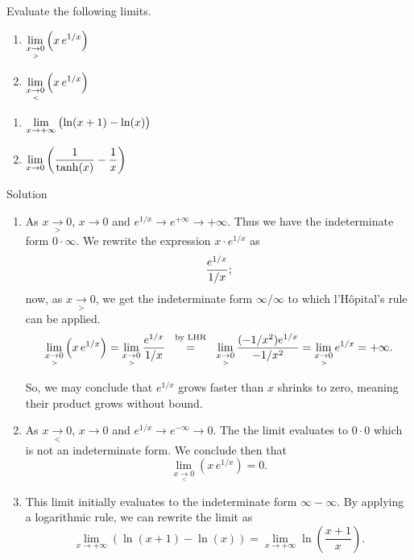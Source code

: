 \begin{example}\label{ex_LHR3}
Evaluate the following limits.

\noindent
\begin{minipage}[t]{.5\textwidth}
\begin{enumerate}
\item		$\displaystyle \lim_{x\underset{>}{\rightarrow}0} \left(x\, e^{1/x}\right)$
\item		$\displaystyle \lim_{x\underset{<}{\rightarrow}0} \left(x\, e^{1/x}\right)$
\end{enumerate}
\end{minipage}
\begin{minipage}[t]{.5\textwidth}
\begin{enumerate}\addtocounter{enumi}{2}
\item		$\displaystyle \lim_{x\to+\infty}\left( \ln(x+1)-\ln (x)\right)$
\ifanalysis\item $\displaystyle \lim_{x\to0}\left( \dfrac{1}{\tanh(x)}-\dfrac{1}{x}\right)$\fi
\end{enumerate}
\end{minipage}

Solution 

\begin{enumerate}
\item		As $x\underset{>}{\rightarrow}0$, $x\rightarrow 0$ and $e^{1/x}\rightarrow e^{+\infty}\rightarrow+\infty$. Thus we have the indeterminate form $0\cdot\infty$. We rewrite the expression $x\cdot e^{1/x}$ as $$\displaystyle\frac{e^{1/x}}{1/x};$$
now, as $x\underset{>}{\rightarrow}0$, we get the indeterminate form $\infty/\infty$ to which l'H\^opital's rule can be applied. 
$$ \lim_{x\underset{>}{\rightarrow}0} \left(x\, e^{1/x}\right) = \lim_{x\underset{>}{\rightarrow}0} \frac{e^{1/x}}{1/x} \stackrel{\ \text{ by LHR \rule[-5pt]{0pt}{3pt}} \ }{=} \lim_{x\underset{>}{\rightarrow}0}\frac{(-1/x^2)e^{1/x}}{-1/x^2} =\lim_{x\underset{>}{\rightarrow}0}e^{1/x} =+\infty.$$

So, we may conclude that $e^{1/x}$ grows faster than $x$ shrinks to zero, meaning their product grows without bound.

\item		As $x\underset{<}{\rightarrow}0$, $x\rightarrow 0$ and $e^{1/x}\rightarrow e^{-\infty}\rightarrow 0$. The the limit evaluates to $0\cdot 0$ which is not an indeterminate form. We conclude then that $$\lim_{x\underset{<}{\rightarrow}0}\left(x\, e^{1/x}\right) = 0.$$

\item		This limit initially evaluates to the indeterminate form $\infty-\infty$. By applying a logarithmic rule, we can rewrite the limit as 
$$ \lim_{x\to+\infty}\left( \ln(x+1)-\ln (x) \right)= \lim_{x\to+\infty} \ln \left(\frac{x+1}x\right).$$


\end{enumerate}
\end{example}
